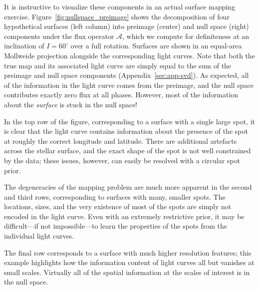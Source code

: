 \documentclass[modern,linenumbers]{aastex62}
\begin{document}
It is instructive to visualize these components in
an actual surface mapping exercise. Figure~\ref{fig:nullspace_preimage}
shows the decomposition of four hypothetical surfaces (left
column) into preimage (center) and null space (right)
components under the flux operator $\pmb{\mathcal{A}}$, which we compute for
definiteness at an inclination of $I = 60^\circ$ over a full rotation.
Surfaces are shown in an equal-area Mollweide projection alongside
the corresponding light curves.
Note that both the true map and its associated light curve are simply equal to
the sum of the preimage and null space components (Appendix~\ref{sec:app-svd}).
%
As expected, all of the information in the light curve comes
from the preimage, and the null space contributes exactly zero
flux at all phases. However, most of the information about the
\emph{surface} is stuck in the null space!

In the top row of the figure, corresponding to a surface with
a single large spot, it is clear that the light curve
contains information about the presence of the spot at roughly the
correct longitude and latitude. There are additional artefacts
across the stellar surface, and the exact shape of the spot is
not well constrained by the data; these issues, however, can
easily be resolved with a circular spot prior.

The degeneracies of the mapping problem are much more apparent
in the second and third rows, corresponding to surfaces with
many, smaller spots. The locations, sizes, and the very existence
of most of the spots are simply not encoded in the light curve.
Even with an extremely restrictive prior, it may be difficult---if
not impossible---to learn the properties of the spots
from the individual light curves.

The final row corresponds to a surface with much higher resolution
features; this example highlights how the information content of
light curves all but vanishes at small scales. Virtually all of the
spatial information at the scales of interest is in the null space.
\end{document}
